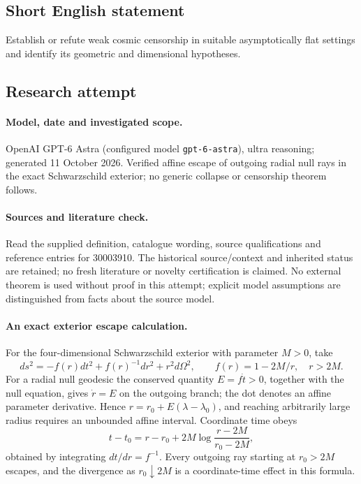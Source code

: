 \documentclass[11pt]{article}
\begin{document}
\subsection{Short English statement}
Establish or refute weak cosmic censorship in suitable asymptotically flat settings and identify its geometric and dimensional hypotheses.
\subsection{Research attempt}
\paragraph{Model, date and investigated scope.}
OpenAI GPT-6 Astra (configured model \texttt{gpt-6-astra}), ultra reasoning; generated 11 October 2026. Verified affine escape of outgoing radial null rays in the exact Schwarzschild exterior; no generic collapse or censorship theorem follows.

\paragraph{Sources and literature check.}
Read the supplied definition, catalogue wording, source qualifications and reference entries for 30003910. The historical source/context and inherited status are retained; no fresh literature or novelty certification is claimed. No external theorem is used without proof in this attempt; explicit model assumptions are distinguished from facts about the source model.

\paragraph{An exact exterior escape calculation.} For the four-dimensional Schwarzschild exterior with parameter \(M>0\), take
\[
 ds^2=-f(r)dt^2+f(r)^{-1}dr^2+r^2d\Omega^2,\qquad f(r)=1-2M/r,\quad r>2M.
\]
For a radial null geodesic the conserved quantity \(E=f\dot t>0\), together with the null equation, gives \(\dot r=E\) on the outgoing branch; the dot denotes an affine parameter derivative. Hence \(r=r_0+E(\lambda-\lambda_0)\), and reaching arbitrarily large radius requires an unbounded affine interval. Coordinate time obeys
\[
 t-t_0=r-r_0+2M\log\frac{r-2M}{r_0-2M},
\]
obtained by integrating \(dt/dr=f^{-1}\). Every outgoing ray starting at \(r_0>2M\) escapes, and the divergence as \(r_0\downarrow2M\) is a coordinate-time effect in this formula.
\end{document}
